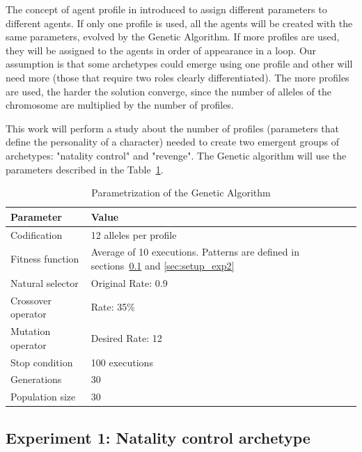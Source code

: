 \documentclass[runningheads]{llncs}
\begin{document}
The concept of agent profile in introduced to assign different parameters to different agents. If only one profile is used, all the agents will be created with the same parameters, evolved by the Genetic Algorithm. If more profiles are used, they will be assigned to the agents in order of appearance in a loop. Our assumption is that some archetypes could emerge using one profile and other will need more (those that require two roles clearly differentiated). The more profiles are used, the harder the solution converge, since the number of alleles of the chromosome are multiplied by the number of profiles.

This work will perform a study about the number of profiles (parameters that define the personality of a character) needed to create two emergent groups of archetypes: "natality control" and "revenge".
The Genetic algorithm will use the parameters described in the Table~\ref{fig:ga_parameters}. 

\begin{table}
\begin{center}
\caption{Parametrization of the Genetic Algorithm}
\label{fig:ga_parameters}
\begin{tabular}{p{3cm}p{7cm}}
\hline\noalign{\smallskip}
\noalign{\smallskip}
Parameter & Value \\
\hline
\noalign{\smallskip}
Codification & 12 alleles per profile\\
Fitness function & Average of 10 executions. Patterns are defined in sections~\ref{sec:setup_exp1} and \ref{sec:setup_exp2}\\
Natural selector & Original Rate: 0.9 \\
Crossover operator & Rate: 35\% \\
Mutation operator & Desired Rate: 12 \\
Stop condition & 100 executions\\
Generations & 30\\
Population size & 30 \\
\hline
\end{tabular}


\end{center}
\end{table}


\subsection{Experiment 1: Natality control archetype}
\label{sec:setup_exp1}
\end{document}
